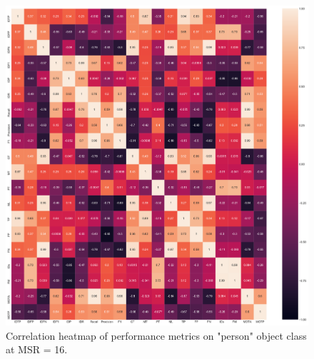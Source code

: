 \begin{figure}[!htbp]
  \centering
  \includegraphics[width=1.0\linewidth]{img/correlation.pdf}
  \caption[Correlation heatmap of performance metrics on "person" object class at MSR = 16]
  {
  Correlation heatmap of performance metrics on "person" object class at MSR = 16.
  }
  \label{fig:correlation}
\end{figure}